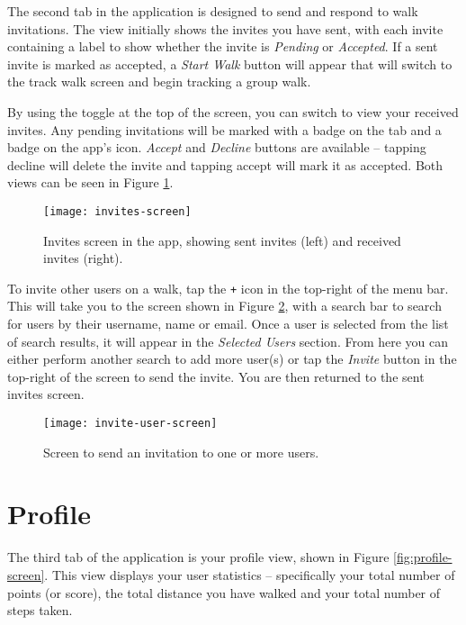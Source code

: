 The second tab in the application is designed to send and respond to walk invitations. The view initially shows the invites you have sent, with each invite containing a label to show whether the invite is \textit{Pending} or \textit{Accepted}. If a sent invite is marked as accepted, a \textit{Start Walk} button will appear that will switch to the track walk screen and begin tracking a group walk.

By using the toggle at the top of the screen, you can switch to view your received invites. Any pending invitations will be marked with a badge on the tab and a badge on the app's icon. \textit{Accept} and \textit{Decline} buttons are available -- tapping decline will delete the invite and tapping accept will mark it as accepted. Both views can be seen in Figure \ref{fig:invites-screen}.

\begin{figure}[hbt]
  \centering
  \texttt{[image: invites-screen]}
  \caption{Invites screen in the app, showing sent invites (left) and received invites (right).}
  \label{fig:invites-screen}
\end{figure}

To invite other users on a walk, tap the \texttt{+} icon in the top-right of the menu bar. This will take you to the screen shown in Figure \ref{fig:invite-user-screen}, with a search bar to search for users by their username, name or email. Once a user is selected from the list of search results, it will appear in the \textit{Selected Users} section. From here you can either perform another search to add more user(s) or tap the \textit{Invite} button in the top-right of the screen to send the invite. You are then returned to the sent invites screen.

\begin{figure}[hbt]
  \centering
  \texttt{[image: invite-user-screen]}
  \caption{Screen to send an invitation to one or more users.}
  \label{fig:invite-user-screen}
\end{figure}


\section{Profile}

The third tab of the application is your profile view, shown in Figure \ref{fig:profile-screen}. This view displays your user statistics -- specifically your total number of points (or score), the total distance you have walked and your total number of steps taken.

